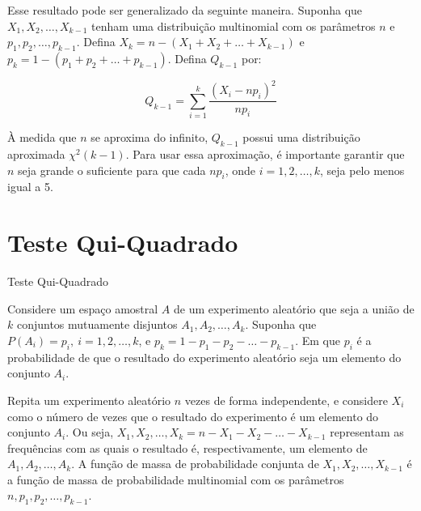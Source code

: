 \documentclass[12pt]{beamer}
\begin{document}
\begin{frame}{}
\begin{block}{}
\justifying
Esse resultado pode ser generalizado da seguinte maneira. Suponha que $X_1, X_2, \ldots, X_{k-1}$ tenham uma distribuição multinomial com os parâmetros $n$ e $p_1, p_2, \ldots, p_{k-1}$. Defina $X_k = n - (X_1 + X_2 + \ldots + X_{k-1})$ e $p_k = 1 - (p_1 + p_2 + \ldots + p_{k-1})$. Defina $Q_{k-1}$ por:

\[
Q_{k-1} = \sum_{i=1}^{k} \frac{(X_i - n p_i)^2}{n p_i}
\]

À medida que $n$ se aproxima do infinito, $Q_{k-1}$ possui uma distribuição aproximada $\chi^2(k - 1)$. Para usar essa aproximação, é importante garantir que $n$ seja grande o suficiente para que cada $n p_i$, onde $i = 1, 2, \ldots, k$, seja pelo menos igual a 5.
\end{block}
\end{frame}

\section{Teste Qui-Quadrado}
\begin{frame}{Teste Qui-Quadrado}
\begin{block}{}
\justifying
Considere um espaço amostral $A$ de um experimento aleatório que seja a união de $k$ conjuntos mutuamente disjuntos $A_1, A_2, \ldots, A_k$. Suponha que $P(A_i) = p_i,~i = 1, 2, \ldots, k$, e $p_k = 1 - p_1 - p_2 - \ldots - p_{k-1}$. Em que $p_i$ é a probabilidade de que o resultado do experimento aleatório seja um elemento do conjunto $A_i$.
\end{block}
\pause
\begin{block}{}
\justifying
Repita um experimento aleatório $n$ vezes de forma independente, e considere $X_i$ como o número de vezes que o resultado do experimento é um elemento do conjunto $A_i$. Ou seja, $X_1, X_2, \ldots, X_k = n - X_1 - X_2 - \ldots - X_{k-1}$ representam as frequências com as quais o resultado é, respectivamente, um elemento de $A_1, A_2, \ldots, A_k$. A função de massa de probabilidade conjunta de $X_1, X_2, \ldots, X_{k-1}$ é a função de massa de probabilidade multinomial com os parâmetros $n, p_1, p_2, \ldots, p_{k-1}$.    
\end{block}
\end{frame}
\end{document}
